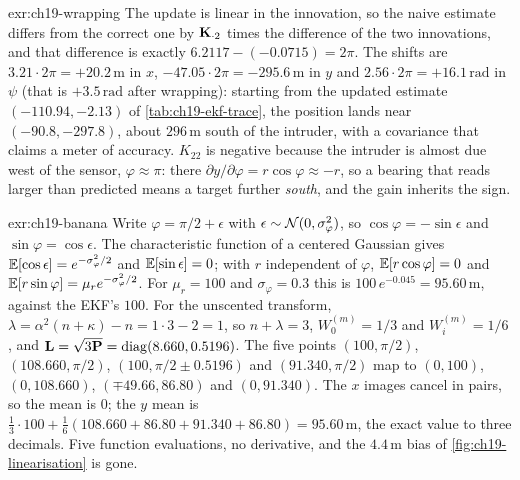 \begin{solution}{exr:ch19-wrapping}
The update is linear in the innovation, so the naive estimate differs from the correct one by $\mathbf{K}_{\cdot 2}$ times the difference of the two innovations, and that difference is exactly $6.2117 - (-0.0715) = 2\pi$. The shifts are $3.21 \cdot 2\pi = +20.2\,\mathrm{m}$ in $x$, $-47.05 \cdot 2\pi = -295.6\,\mathrm{m}$ in $y$ and $2.56 \cdot 2\pi = +16.1\,\mathrm{rad}$ in $\psi$ (that is $+3.5\,\mathrm{rad}$ after wrapping): starting from the updated estimate $(-110.94, -2.13)$ of \cref{tab:ch19-ekf-trace}, the position lands near $(-90.8, -297.8)$, about $296\,\mathrm{m}$ south of the intruder, with a covariance that claims a meter of accuracy. $K_{22}$ is negative because the intruder is almost due west of the sensor, $\varphi \approx \pi$: there $\partial y / \partial\varphi = r\cos\varphi \approx -r$, so a bearing that reads larger than predicted means a target further \emph{south}, and the gain inherits the sign.
\end{solution}

\begin{solution}{exr:ch19-banana}
Write $\varphi = \pi/2 + \epsilon$ with $\epsilon \sim \mathcal{N}(0, \sigma_\varphi^2)$, so $\cos\varphi = -\sin\epsilon$ and $\sin\varphi = \cos\epsilon$. The characteristic function of a centered Gaussian gives $\mathbb{E}[\cos\epsilon] = e^{-\sigma_\varphi^2/2}$ and $\mathbb{E}[\sin\epsilon] = 0$; with $r$ independent of $\varphi$, $\mathbb{E}[r\cos\varphi] = 0$ and $\mathbb{E}[r\sin\varphi] = \mu_r e^{-\sigma_\varphi^2/2}$. For $\mu_r = 100$ and $\sigma_\varphi = 0.3$ this is $100\,e^{-0.045} = 95.60\,\mathrm{m}$, against the EKF's $100$. For the unscented transform, $\lambda = \alpha^2(n + \kappa) - n = 1 \cdot 3 - 2 = 1$, so $n + \lambda = 3$, $W_0^{(m)} = 1/3$ and $W_i^{(m)} = 1/6$, and $\mathbf{L} = \sqrt{3\mathbf{P}} = \operatorname{diag}(8.660, 0.5196)$. The five points $(100, \pi/2)$, $(108.660, \pi/2)$, $(100, \pi/2 \pm 0.5196)$ and $(91.340, \pi/2)$ map to $(0, 100)$, $(0, 108.660)$, $(\mp 49.66, 86.80)$ and $(0, 91.340)$. The $x$ images cancel in pairs, so the mean is $0$; the $y$ mean is $\tfrac13 \cdot 100 + \tfrac16(108.660 + 86.80 + 91.340 + 86.80) = 95.60\,\mathrm{m}$, the exact value to three decimals. Five function evaluations, no derivative, and the $4.4\,\mathrm{m}$ bias of \cref{fig:ch19-linearisation} is gone.
\end{solution}

